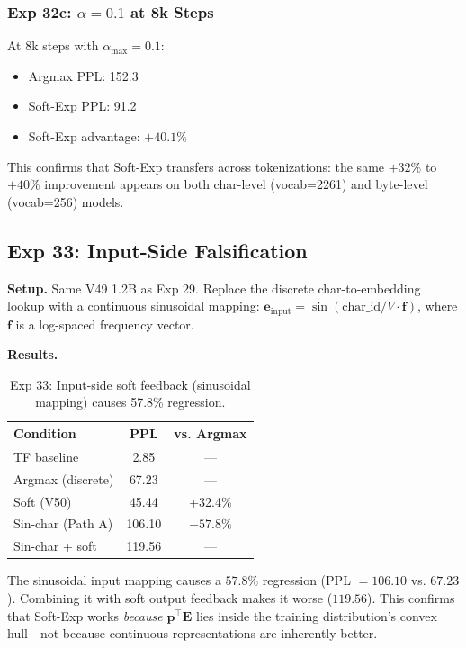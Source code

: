 \documentclass[11pt]{article}
\begin{document}
\subsubsection{Exp 32c: $\alpha=0.1$ at 8k Steps}
\label{sec:exp32c}

At 8k steps with $\alpha_{\max} = 0.1$:
\begin{itemize}
    \item Argmax PPL: 152.3
    \item Soft-Exp PPL: 91.2
    \item Soft-Exp advantage: $+40.1\%$
\end{itemize}

This confirms that Soft-Exp transfers across tokenizations: the same $+32\%$ to $+40\%$ improvement appears on both char-level (vocab=2261) and byte-level (vocab=256) models.

\subsection{Exp 33: Input-Side Falsification}
\label{sec:exp33}

\textbf{Setup.} Same V49 1.2B as Exp 29. Replace the discrete char-to-embedding lookup with a continuous sinusoidal mapping: $\mathbf{e}_{\text{input}} = \sin(\text{char\_id} / V \cdot \mathbf{f})$, where $\mathbf{f}$ is a log-spaced frequency vector.

\textbf{Results.}
\begin{table}[h]
\centering
\begin{tabular}{lcc}
\toprule
Condition & PPL & vs. Argmax \\
\midrule
TF baseline & 2.85 & — \\
Argmax (discrete) & 67.23 & — \\
Soft (V50) & 45.44 & +32.4\% \\
Sin-char (Path A) & 106.10 & \textbf{$-57.8\%$} \\
Sin-char + soft & 119.56 & — \\
\bottomrule
\end{tabular}
\caption{Exp 33: Input-side soft feedback (sinusoidal mapping) causes 57.8\% regression.}
\label{tab:exp33}
\end{table}

The sinusoidal input mapping causes a $57.8\%$ regression (PPL $= 106.10$ vs. $67.23$). Combining it with soft output feedback makes it worse ($119.56$). This confirms that Soft-Exp works \emph{because} $\mathbf{p}^\top \mathbf{E}$ lies inside the training distribution's convex hull—not because continuous representations are inherently better.
\end{document}
